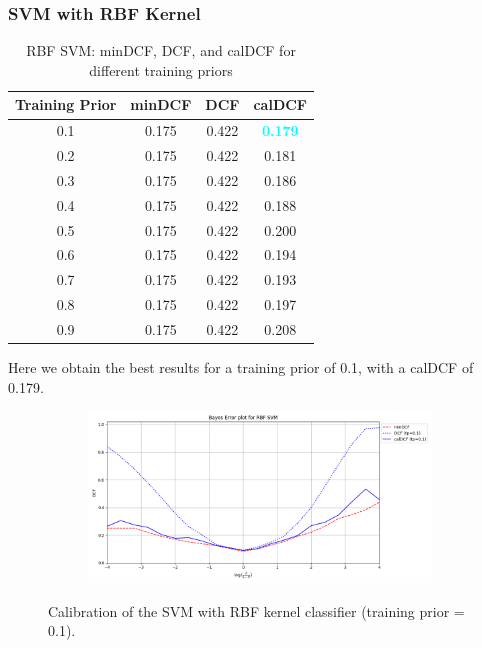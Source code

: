 \documentclass[12pt]{report}
\begin{document}
\subsubsection*{SVM with RBF Kernel}
\begin{table}[H]
    \centering
    \begin{tabular}{|c|c|c|c|}
        \hline
        \rowcolor{blue!10}
        \textbf{Training Prior} & \textbf{minDCF} & \textbf{DCF} & \textbf{calDCF}                  \\
        \hline
        0.1                     & 0.175           & 0.422        & \textcolor{cyan}{\textbf{0.179}} \\
        \hline
        0.2                     & 0.175           & 0.422        & 0.181                            \\
        \hline
        0.3                     & 0.175           & 0.422        & 0.186                            \\
        \hline
        0.4                     & 0.175           & 0.422        & 0.188                            \\
        \hline
        0.5                     & 0.175           & 0.422        & 0.200                            \\
        \hline
        0.6                     & 0.175           & 0.422        & 0.194                            \\
        \hline
        0.7                     & 0.175           & 0.422        & 0.193                            \\
        \hline
        0.8                     & 0.175           & 0.422        & 0.197                            \\
        \hline
        0.9                     & 0.175           & 0.422        & 0.208                            \\
        \hline
    \end{tabular}
    \caption{RBF SVM: minDCF, DCF, and calDCF for different training priors}
    \label{tab:RBF_SVM_Priors}
\end{table}
\noindent
Here we obtain the best results for a training prior of 0.1, with a calDCF of 0.179.
\begin{figure}[H]
    \centering
    \begin{subfigure}[t]{0.6\textwidth}
        \includegraphics[width=\textwidth]{./plot/calibration/RBF_SVM.png}
    \end{subfigure}
    \caption{Calibration of the SVM with RBF kernel classifier (training prior = 0.1).}
    \label{fig:calibration_SVM}
\end{figure}
\end{document}
